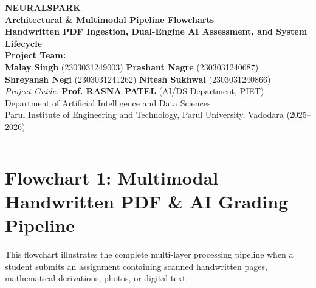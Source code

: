 \documentclass[11pt,a4paper]{article}
\begin{document}
\begin{center}
    {\Huge\bfseries\textcolor{primaryblue}{NEURALSPARK}}\\[0.15cm]
    {\Large\bfseries Architectural \& Multimodal Pipeline Flowcharts}\\[0.2cm]
    {\normalsize\textbf{Handwritten PDF Ingestion, Dual-Engine AI Assessment, and System Lifecycle}}\\[0.3cm]
    
    \textbf{Project Team:}\\
    \textbf{Malay Singh} (2303031249003) \quad \textbf{Prashant Nagre} (2303031240687)\\
    \textbf{Shreyansh Negi} (2303031241262) \quad \textbf{Nitesh Sukhwal} (2303031240866)\\[0.15cm]
    
    \textit{Project Guide:} \textbf{Prof. RASNA PATEL} (AI/DS Department, PIET)\\[0.05cm]
    \small Department of Artificial Intelligence and Data Sciences\\
    Parul Institute of Engineering and Technology, Parul University, Vadodara \quad (2025--2026)
\end{center}

\vspace{0.1cm}
\hrule
\vspace{0.3cm}

\section{Flowchart 1: Multimodal Handwritten PDF \& AI Grading Pipeline}
\noindent
This flowchart illustrates the complete multi-layer processing pipeline when a student submits an assignment containing scanned handwritten pages, mathematical derivations, photos, or digital text.
\end{document}
